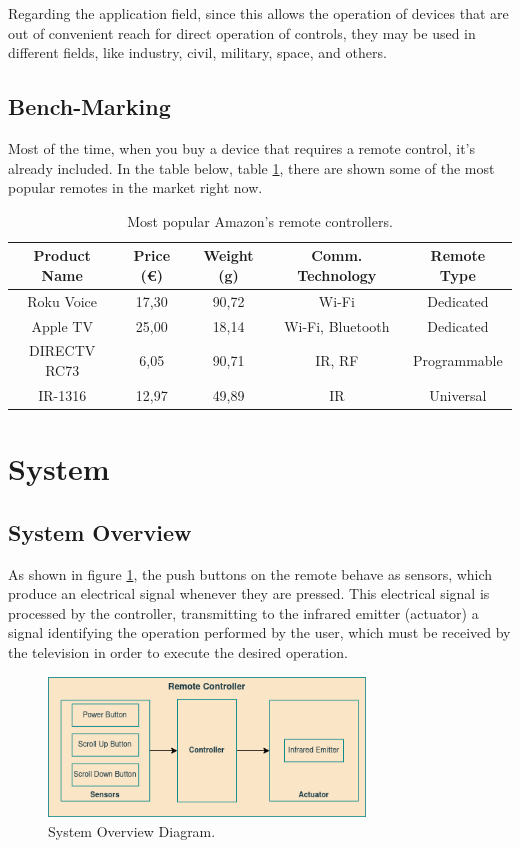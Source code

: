 \documentclass[12pt, letterpaper]{report}
\begin{document}
Regarding the application field, since this allows the operation of devices that are out of convenient reach for direct operation of controls, they may be used in different fields, like industry, civil, military, space, and others.

\subsection{Bench-Marking}
Most of the time, when you buy a device that requires a remote control, it's already included. In the table below, table \ref{table:popular_remotes}, there are shown some of the most popular remotes in the market right now.

\begin{table}[h]
	\centering
	\begin{tabular}{||c c c c c||} 
	\hline
	Product Name & Price (€) & Weight (g) & Comm. Technology & Remote Type\\
	\hline\hline
	Roku Voice & 17,30 & 90,72 & Wi-Fi & Dedicated\\ 
	Apple TV & 25,00 & 18,14 & Wi-Fi, Bluetooth & Dedicated \\
	DIRECTV RC73 & 6,05 & 90,71 & IR, RF & Programmable\\
	IR-1316 & 12,97 & 49,89 & IR & Universal\\
	\hline
\end{tabular}
				
\caption{Most popular Amazon's remote controllers. }
\label{table:popular_remotes}
\end{table}
		
\section{System}
\subsection{System Overview}
As shown in figure \ref{fig:sys_overview}, the push buttons on the remote behave as sensors, which produce an electrical signal whenever they are pressed. This electrical signal is processed by the controller, transmitting to the infrared emitter (actuator) a signal identifying the operation performed by the user, which must be received by the television in order to execute the desired operation.

\begin{figure}[ht]
	\centering
	\includegraphics[width=0.75\textwidth]{SysOverview}
	\caption{System Overview Diagram.}
	\label{fig:sys_overview}
\end{figure}
\end{document}
